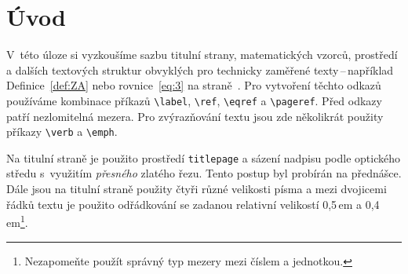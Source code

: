 \documentclass[twocolumn,a4paper,11pt]{article}
\theoremstyle{definition}
\theoremstyle{plain}
\begin{document}

\clearpage
{}

\section*{Úvod}
\label{sec:intro}
V~této úloze si vyzkoušíme sazbu titulní strany, matematických vzorců, prostředí a dalších textových struktur obvyklých pro technicky zaměřené texty\,--\,například Definice~\ref{def:ZA} nebo rovnice~\eqref{eq:3} na straně~\pageref{sec:rovnice}. Pro vytvoření těchto odkazů používáme kombinace příkazů \verb|\label|, \verb|\ref|, \verb|\eqref| a \verb|\pageref|. Před odkazy patří nezlomitelná mezera. Pro zvýrazňování textu jsou zde několikrát použity příkazy \verb|\verb| a \verb|\emph|.

Na titulní straně je použito prostředí \verb|titlepage| a sázení nadpisu podle optického středu s~využitím \emph{přesného} zlatého řezu. Tento postup byl probírán na přednášce. Dále jsou na titulní straně použity čtyři různé velikosti písma a mezi dvojicemi řádků textu je použito odřádkování se zadanou relativní velikostí 0,5\,em a 0,4\,em\footnote{Nezapomeňte použít správný typ mezery mezi číslem a jednotkou.}.
\end{document}
